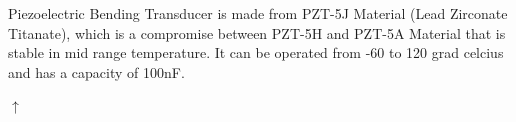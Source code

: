 \documentclass[12pt]{article}
\begin{document}
Piezoelectric Bending Transducer is made from PZT-5J Material (Lead Zirconate Titanate), which is a compromise between PZT-5H and PZT-5A Material that is stable in mid range temperature. It can be operated from -60 to 120 grad celcius and has a capacity of 100nF.

\newpage
\printbibliography
{}
\begin{center}
\hyperref[sec:drucksensoren]{\large{$\uparrow$}}
\end{center}
\newpage

\end{document}
